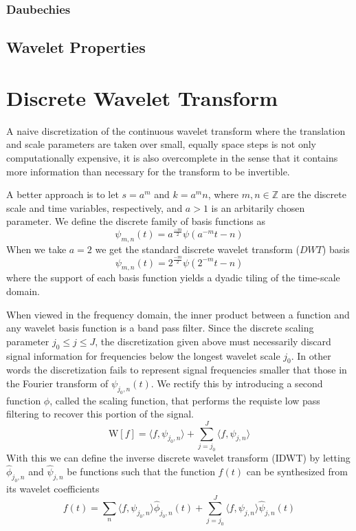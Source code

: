 \documentclass[12pt]{article}
\newcommand{\DWT}[1]{\mathrm{W}[#1]}
\newcommand{\innerprod}[2]{\langle #1, #2 \rangle}
\newcommand{\Zset}{\mathbb{Z}}
\begin{document}
\subsubsection{Daubechies}

\subsection{Wavelet Properties}



\section{Discrete Wavelet Transform}

A naive discretization of the continuous wavelet transform where the translation and scale parameters are taken over small, equally space steps is not only computationally expensive, it is also overcomplete in the sense that it contains more information than necessary for the transform to be invertible.

A better approach is to let $s = a^m$ and $k = a^m n$, where $m, n \in \Zset$ are the discrete scale and time variables, respectively, and $a > 1$ is an arbitarily chosen parameter.  We define the discrete family of basis functions as
\begin{equation}
    \psi_{m, n}(t) = a^{\frac{-m}{2}} \psi(a^{-m}t - n)
\end{equation}
When we take $a = 2$ we get the standard discrete wavelet transform ($DWT$) basis
\begin{equation}
    \psi_{m, n}(t) = 2^{\frac{-m}{2}} \psi(2^{-m}t - n)
\end{equation}
where the support of each basis function yields a dyadic tiling of the time-scale domain.

When viewed in the frequency domain, the inner product between a function and any wavelet basis function is a band pass filter.
Since the discrete scaling parameter $j_0 \le j \le J$, the discretization given above must necessarily discard signal information for frequencies below the longest wavelet scale $j_0$.  In other words the discretization fails to represent signal frequencies smaller that those in the Fourier transform of $\psi_{j_0, n}(t)$.
We rectify this by introducing a second function $\phi$, called the scaling function, that performs the requiste low pass filtering to recover this portion of the signal.
\begin{equation}
    \DWT{f} = \innerprod{f}{\psi_{j_0, n}} + \sum_{j = j_0}^{J} \innerprod{f}{\psi_{j, n}}
\end{equation}
With this we can define the inverse discrete wavelet transform (IDWT) by letting $\hat{\phi}_{j_0, n}$ and $\hat{\psi}_{j, n}$ be functions such that the function $f(t)$ can be synthesized from its wavelet coefficients
\begin{equation}
    f(t) = \sum_n \innerprod{f}{\psi_{j_0, n}} \hat{\phi}_{j_0, n}(t) + \sum_{j = j_0}^{J} \innerprod{f}{\psi_{j, n}} \hat{\psi}_{j, n}(t)
\end{equation}
\end{document}
